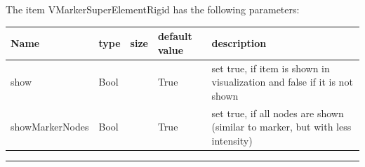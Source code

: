\noindent The item VMarkerSuperElementRigid has the following parameters:
\begin{center}
  \footnotesize
  \begin{longtable}{| p{4.5cm} | p{2.5cm} | p{0.5cm} | p{2.5cm} | p{6cm} |}
    \hline
    \bf Name & \bf type & \bf size & \bf default value & \bf description \\ \hline
    show &     Bool &      &     True &     set true, if item is shown in visualization and false if it is not shown\\ \hline
    showMarkerNodes &     Bool &      &     True &     set true, if all nodes are shown (similar to marker, but with less intensity)\\ \hline
\end{longtable}
\end{center}
\par\noindent\rule{\textwidth}{0.4pt}
\label{description_MarkerSuperElementRigid}
